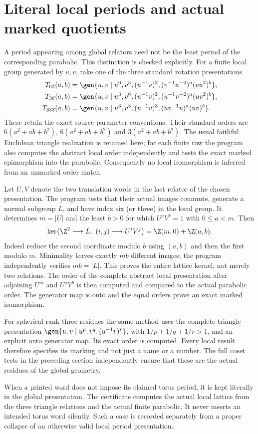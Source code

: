 \section{Literal local periods and actual marked quotients}
A period appearing among global relators need not be the least period
of the corresponding parabolic. This distinction is checked explicitly.
For a finite local group generated by $u,v$, take one of the three
standard rotation presentations
\begin{align*}
 T_{63}(a,b)&=\gen{u,v\mid u^6,v^3,(u^{-1}v)^2,
                (v^{-1}u^{-2})^a(vu^2)^b},\\
 T_{36}(a,b)&=\gen{u,v\mid u^3,v^6,(u^{-1}v)^2,
                (u^{-1}v^{-2})^a(uv^2)^b},\\
 T_{333}(a,b)&=\gen{u,v\mid u^3,v^3,(u^{-1}v)^3,
                (uv^{-1}u)^a(uv)^b}.
\end{align*}
These retain the exact source parameter conventions. Their standard orders
are $6(a^2+ab+b^2)$, $6(a^2+ab+b^2)$ and $3(a^2+ab+b^2)$.
The usual faithful Euclidean triangle realization is retained here;
for each finite row the program also computes the abstract local order
independently and tests the exact marked epimorphism into the parabolic.
Consequently no local isomorphism is inferred from an unmarked order match.

Let $U,V$ denote the two translation words in the last relator of the
chosen presentation. The program tests that their actual images commute,
generate a normal subgroup $L$, and have index six (or three) in the
local group. It determines $m=|U|$ and the least $b>0$ for which
$U^aV^b=1$ with $0\leq a<m$. Then
\[
 \ker\bigl(\Z^2\longrightarrow L,\ (i,j)\longmapsto U^iV^j\bigr)
       =\Z(m,0)+\Z(a,b).
\]
Indeed reduce the second coordinate modulo $b$ using $(a,b)$ and then
the first modulo $m$. Minimality leaves exactly $mb$ different images;
the program independently verifies $mb=|L|$. This proves the entire
lattice kernel, not merely two relations. The order of the complete
abstract local presentation after adjoining $U^m$ and $U^aV^b$ is then
computed and compared to the actual parabolic order. The generator map
is onto and the equal orders prove an exact marked isomorphism.

For spherical rank-three residues the same method uses the complete
triangle presentation $\gen{u,v\mid u^p,v^q,(u^{-1}v)^r}$, with
$1/p+1/q+1/r>1$, and an explicit onto generator map. Its exact order is
computed. Every local result therefore specifies its marking and not
just a name or a number. The full coset tests in the preceding section
independently ensure that these are the actual residues of the global
geometry.

When a printed word does not impose its claimed torus period, it is
kept literally in the global presentation. The certificate computes
the actual local lattice from the three triangle relations and the
actual finite parabolic. It never inserts an intended torus word
silently. Such a case is recorded separately from a proper collapse
of an otherwise valid local period presentation.
